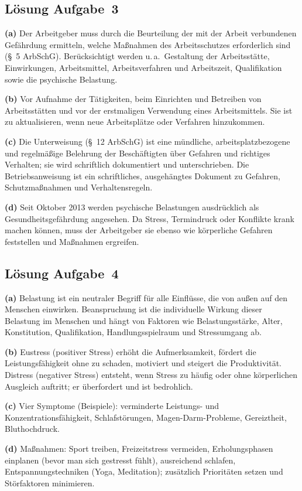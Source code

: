 \documentclass[11pt, a4paper]{article}
\begin{document}
\subsection*{Lösung Aufgabe~3}
\begin{loesung}
\textbf{(a)} Der Arbeitgeber muss durch die Beurteilung der mit der Arbeit verbundenen
Gefährdung ermitteln, welche Maßnahmen des Arbeitsschutzes erforderlich sind (\S~5 ArbSchG).
Berücksichtigt werden u.\,a.\ Gestaltung der Arbeitsstätte, Einwirkungen, Arbeitsmittel,
Arbeitsverfahren und Arbeitszeit, Qualifikation sowie die psychische Belastung.

\textbf{(b)} Vor Aufnahme der Tätigkeiten, beim Einrichten und Betreiben von Arbeitsstätten
und vor der erstmaligen Verwendung eines Arbeitsmittels. Sie ist zu aktualisieren, wenn
neue Arbeitsplätze oder Verfahren hinzukommen.

\textbf{(c)} Die Unterweisung (\S~12 ArbSchG) ist eine mündliche, arbeitsplatzbezogene
und regelmäßige Belehrung der Beschäftigten über Gefahren und richtiges Verhalten; sie wird
schriftlich dokumentiert und unterschrieben. Die Betriebsanweisung ist ein schriftliches,
ausgehängtes Dokument zu Gefahren, Schutzmaßnahmen und Verhaltensregeln.

\textbf{(d)} Seit Oktober 2013 werden psychische Belastungen ausdrücklich als
Gesundheitsgefährdung angesehen. Da Stress, Termindruck oder Konflikte krank machen können,
muss der Arbeitgeber sie ebenso wie körperliche Gefahren feststellen und Maßnahmen ergreifen.
\end{loesung}

\subsection*{Lösung Aufgabe~4}
\begin{loesung}
\textbf{(a)} Belastung ist ein neutraler Begriff für alle Einflüsse, die von außen auf den
Menschen einwirken. Beanspruchung ist die individuelle Wirkung dieser Belastung im Menschen
und hängt von Faktoren wie Belastungsstärke, Alter, Konstitution, Qualifikation,
Handlungsspielraum und Stressumgang ab.

\textbf{(b)} Eustress (positiver Stress) erhöht die Aufmerksamkeit, fördert die
Leistungsfähigkeit ohne zu schaden, motiviert und steigert die Produktivität. Distress
(negativer Stress) entsteht, wenn Stress zu häufig oder ohne körperlichen Ausgleich
auftritt; er überfordert und ist bedrohlich.

\textbf{(c)} Vier Symptome (Beispiele): verminderte Leistungs- und Konzentrationsfähigkeit,
Schlafstörungen, Magen-Darm-Probleme, Gereiztheit, Bluthochdruck.

\textbf{(d)} Maßnahmen: Sport treiben, Freizeitstress vermeiden, Erholungsphasen einplanen
(bevor man sich gestresst fühlt), ausreichend schlafen, Entspannungstechniken (Yoga,
Meditation); zusätzlich Prioritäten setzen und Störfaktoren minimieren.
\end{loesung}
\end{document}
